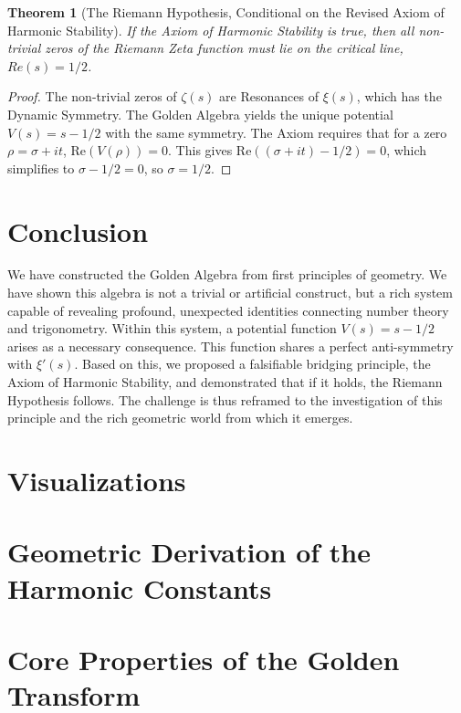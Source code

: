 \documentclass{article}
\theoremstyle{plain}
\newtheorem{theorem}{Theorem}[section]
\theoremstyle{definition}
\theoremstyle{remark}
\begin{document}
\begin{theorem}[The Riemann Hypothesis, Conditional on the Revised Axiom of Harmonic Stability]
If the Axiom of Harmonic Stability is true, then all non-trivial zeros of the Riemann Zeta function must lie on the critical line, $Re(s)=1/2$.
\end{theorem}
\begin{proof}
The non-trivial zeros of $\zeta(s)$ are Resonances of $\xi(s)$, which has the Dynamic Symmetry. The Golden Algebra yields the unique potential $V(s) = s-1/2$ with the same symmetry. The Axiom requires that for a zero $\rho = \sigma+it$, $\text{Re}(V(\rho))=0$. This gives $\text{Re}((\sigma+it)-1/2)=0$, which simplifies to $\sigma - 1/2 = 0$, so $\sigma=1/2$.
\end{proof}

\section{Conclusion}
We have constructed the Golden Algebra from first principles of geometry. We have shown this algebra is not a trivial or artificial construct, but a rich system capable of revealing profound, unexpected identities connecting number theory and trigonometry. Within this system, a potential function $V(s)=s-1/2$ arises as a necessary consequence. This function shares a perfect anti-symmetry with $\xi'(s)$. Based on this, we proposed a falsifiable bridging principle, the Axiom of Harmonic Stability, and demonstrated that if it holds, the Riemann Hypothesis follows. The challenge is thus reframed to the investigation of this principle and the rich geometric world from which it emerges.

\appendix
\section{Visualizations}
\section{Geometric Derivation of the Harmonic Constants}
\section{Core Properties of the Golden Transform}
\end{document}
